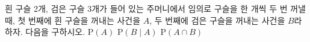 흰 구슬 2개, 검은 구슬 3개가 들어 있는 주머니에서 임의로 구슬을 한 개씩 두 번 꺼낼 때, 첫 번째에 흰 구슬을 꺼내는 사건을 $A$, 두 번째에 검은 구슬을 꺼내는 사건을 $B$라 하자. 다음을 구하시오. 
 $\mathrm{P}(A)$
 $\mathrm{P}(B\mid A)$
 $\mathrm{P}(A\cap B)$
